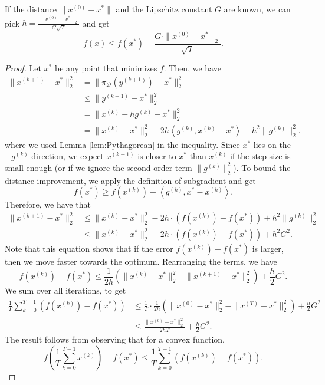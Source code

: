 \begin{rem*}
If the distance $\|x^{(0)}-x^{*}\|$ and the Lipschitz constant $G$
are known, we can pick $h=\frac{\|x^{(0)}-x^{*}\|_{2}}{G\sqrt{T}}$
and get
\[
f(x)\leq f(x^{*})+\frac{G\cdot\|x^{(0)}-x^{*}\|_{2}}{\sqrt{T}}.
\]
\end{rem*}
\begin{proof}
Let $x^{*}$ be any point that minimizes $f$. Then, we have
\begin{align*}
\|x^{(k+1)}-x^{*}\|_{2}^{2} & =\|\pi_{\mathcal{D}}(y^{(k+1)})-x^{*}\|_{2}^{2}\\
 & \leq\|y^{(k+1)}-x^{*}\|_{2}^{2}\\
 & =\|x^{(k)}-hg^{(k)}-x^{*}\|_{2}^{2}\\
 & =\|x^{(k)}-x^{*}\|_{2}^{2}-2h\left\langle g^{(k)},x^{(k)}-x^{*}\right\rangle +h^{2}\|g^{(k)}\|_{2}^{2}.
\end{align*}
where we used Lemma \ref{lem:Pythagorean} in the inequality. Since
$x^{*}$ lies on the $-g^{(k)}$ direction, we expect $x^{(k+1)}$
is closer to $x^{*}$ than $x^{(k)}$ if the step size is small enough
(or if we ignore the second order term $\|g^{(k)}\|_{2}^{2}$). To
bound the distance improvement, we apply the definition of subgradient
and get
\[
f(x^{*})\geq f(x^{(k)})+\left\langle g^{(k)},x^{*}-x^{(k)}\right\rangle .
\]
Therefore, we have that
\begin{align*}
\|x^{(k+1)}-x^{*}\|_{2}^{2} & \leq\|x^{(k)}-x^{*}\|_{2}^{2}-2h\cdot(f(x^{(k)})-f(x^{*}))+h^{2}\|g^{(k)}\|_{2}^{2}\\
 & \leq\|x^{(k)}-x^{*}\|_{2}^{2}-2h\cdot(f(x^{(k)})-f(x^{*}))+h^{2}G^{2}.
\end{align*}
Note that this equation shows that if the error $f(x^{(k)})-f(x^{*})$
is larger, then we move faster towards the optimum. Rearranging the
terms, we have
\[
f(x^{(k)})-f(x^{*})\leq\frac{1}{2h}\left(\|x^{(k)}-x^{*}\|_{2}^{2}-\|x^{(k+1)}-x^{*}\|_{2}^{2}\right)+\frac{h}{2}G^{2}.
\]
We sum over all iterations, to get
\begin{align*}
\frac{1}{T}\sum_{k=0}^{T-1}(f(x^{(k)})-f(x^{*})) & \leq\frac{1}{T}\cdot\frac{1}{2h}(\|x^{(0)}-x^{*}\|_{2}^{2}-\|x^{(T)}-x^{*}\|_{2}^{2})+\frac{h}{2}G^{2}\\
 & \leq\frac{\|x^{(0)}-x^{*}\|_{2}^{2}}{2hT}+\frac{h}{2}G^{2}.
\end{align*}
The result follows from observing that for a convex function, 
\[
f\left(\frac{1}{T}\sum_{k=0}^{T-1}x^{(k)}\right)-f(x^{*})\leq\frac{1}{T}\sum_{k=0}^{T-1}(f(x^{(k)})-f(x^{*})).
\]
\end{proof}


